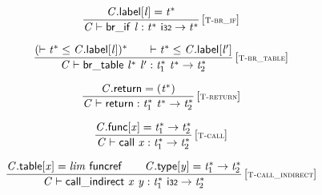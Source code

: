 $$
\begin{array}{@{}c@{}}\displaystyle
\frac{
{\mathit{C}}.\mathsf{label}{}[{\mathit{l}}] = {{\mathit{t}}^\ast}
}{
{\mathit{C}} \vdash \mathsf{br\_if}~{\mathit{l}} : {{\mathit{t}}^\ast}~\mathsf{i{\scriptstyle32}} \rightarrow {{\mathit{t}}^\ast}
} \, {[\textsc{\scriptsize T{-}br\_if}]}
\qquad
\end{array}
$$

$$
\begin{array}{@{}c@{}}\displaystyle
\frac{
({ \vdash }\;{{\mathit{t}}^\ast} \leq {\mathit{C}}.\mathsf{label}{}[{\mathit{l}}])^\ast
 \qquad
{ \vdash }\;{{\mathit{t}}^\ast} \leq {\mathit{C}}.\mathsf{label}{}[{\mathit{l}'}]
}{
{\mathit{C}} \vdash \mathsf{br\_table}~{{\mathit{l}}^\ast}~{\mathit{l}'} : {{\mathit{t}}_{{1}}^\ast}~{{\mathit{t}}^\ast} \rightarrow {{\mathit{t}}_{{2}}^\ast}
} \, {[\textsc{\scriptsize T{-}br\_table}]}
\qquad
\end{array}
$$

\vspace{1ex}

$$
\begin{array}{@{}c@{}}\displaystyle
\frac{
{\mathit{C}}.\mathsf{return} = ({{\mathit{t}}^\ast})
}{
{\mathit{C}} \vdash \mathsf{return} : {{\mathit{t}}_{{1}}^\ast}~{{\mathit{t}}^\ast} \rightarrow {{\mathit{t}}_{{2}}^\ast}
} \, {[\textsc{\scriptsize T{-}return}]}
\qquad
\end{array}
$$

$$
\begin{array}{@{}c@{}}\displaystyle
\frac{
{\mathit{C}}.\mathsf{func}{}[{\mathit{x}}] = {{\mathit{t}}_{{1}}^\ast} \rightarrow {{\mathit{t}}_{{2}}^\ast}
}{
{\mathit{C}} \vdash \mathsf{call}~{\mathit{x}} : {{\mathit{t}}_{{1}}^\ast} \rightarrow {{\mathit{t}}_{{2}}^\ast}
} \, {[\textsc{\scriptsize T{-}call}]}
\qquad
\end{array}
$$

$$
\begin{array}{@{}c@{}}\displaystyle
\frac{
{\mathit{C}}.\mathsf{table}{}[{\mathit{x}}] = {\mathit{lim}}~\mathsf{funcref}
 \qquad
{\mathit{C}}.\mathsf{type}{}[{\mathit{y}}] = {{\mathit{t}}_{{1}}^\ast} \rightarrow {{\mathit{t}}_{{2}}^\ast}
}{
{\mathit{C}} \vdash \mathsf{call\_indirect}~{\mathit{x}}~{\mathit{y}} : {{\mathit{t}}_{{1}}^\ast}~\mathsf{i{\scriptstyle32}} \rightarrow {{\mathit{t}}_{{2}}^\ast}
} \, {[\textsc{\scriptsize T{-}call\_indirect}]}
\qquad
\end{array}
$$

\vspace{1ex}

